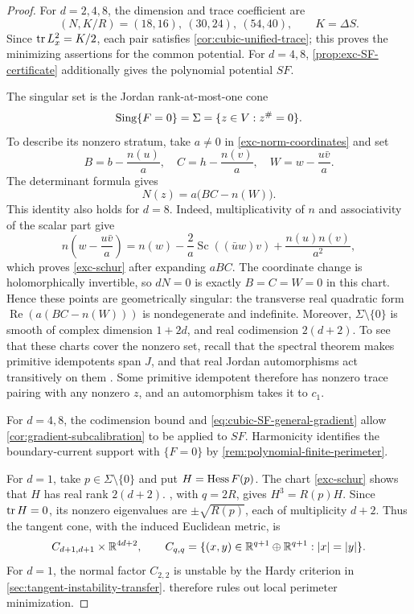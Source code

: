 \begin{proof}
For \(d=2,4,8\), the dimension and trace coefficient are
\[
 (N,K/R)=(18,16),\ (30,24),\ (54,40),\qquad K=\Delta S.
\]
Since \(\operatorname{tr} L_x^2=K/2\), each pair satisfies
\cref{cor:cubic-unified-trace}; this proves the minimizing assertions
for the common potential. For \(d=4,8\),
\cref{prop:exc-SF-certificate} additionally gives the polynomial
potential \(SF\).

The singular set is the Jordan rank-at-most-one cone
\[
 \operatorname{Sing}\{F=0\}=\Sigma=\{z\in V:z^\#=0\}.
\]
To describe its nonzero stratum, take
\(a\neq0\) in \eqref{exc-norm-coordinates} and set
\[
 B=b-\frac{n(u)}a,\quad C=h-\frac{n(v)}a,\quad
 W=w-\frac{u\bar v}a.
\]
The determinant formula gives
\begin{equation}\label{exc-schur}
 N(z)=a\bigl(BC-n(W)\bigr).
\end{equation}
This identity also holds for \(d=8\). Indeed, multiplicativity
of \(n\) and associativity of the scalar part give
\[
 n\!\left(w-\frac{u\bar v}{a}\right)
 =n(w)-\frac{2}{a}\operatorname{Sc}((\bar u w)v)
       +\frac{n(u)n(v)}{a^2},
\]
which proves \eqref{exc-schur} after expanding \(aBC\).
The coordinate change is holomorphically invertible, so
\(dN=0\) is exactly \(B=C=W=0\) in this chart. Hence
these points are geometrically singular: the transverse real
quadratic form \(\operatorname{Re}(a(BC-n(W)))\) is nondegenerate
and indefinite. Moreover,
\(\Sigma\setminus\{0\}\) is smooth of complex dimension
\(1+2d\), and real codimension \(2(d+2)\). To see that these
charts cover the nonzero set, recall that the spectral theorem makes
primitive idempotents span \(J\), and that real Jordan automorphisms
act transitively on them
\cite[Theorem~III.1.2 and Corollary~IV.2.7]{FarautKoranyi94}.
Some primitive idempotent therefore has nonzero trace pairing with
any nonzero \(z\), and an automorphism takes it to \(c_1\).

For \(d=4,8\), the codimension bound and
\eqref{eq:cubic-SF-general-gradient} allow
\cref{cor:gradient-subcalibration} to be applied to \(SF\).
Harmonicity identifies the boundary-current support with \(\{F=0\}\)
by \cref{rem:polynomial-finite-perimeter}.

For \(d=1\), take \(p\in\Sigma\setminus\{0\}\) and put
\(H=\operatorname{Hess} F(p)\). The chart \eqref{exc-schur} shows that
\(H\) has real rank \(2(d+2)\).
, with \(q=2R\), gives
\(H^3=R(p)H\). Since \(\operatorname{tr} H=0\), its nonzero eigenvalues
are \(\pm\sqrt{R(p)}\), each of multiplicity \(d+2\).
Thus the tangent cone, with the induced Euclidean metric, is
\begin{equation}\label{exc-jordan-tangent}
 C_{d+1,d+1}\times\mathbb R^{4d+2},\qquad
 C_{q,q}=\{(x,y)\in\mathbb R^{q+1}\oplus\mathbb R^{q+1}:|x|=|y|\}.
\end{equation}
For \(d=1\), the normal factor \(C_{2,2}\) is unstable by the
Hardy criterion in \cref{sec:tangent-instability-transfer}.
 therefore rules out local
perimeter minimization.
\end{proof}

